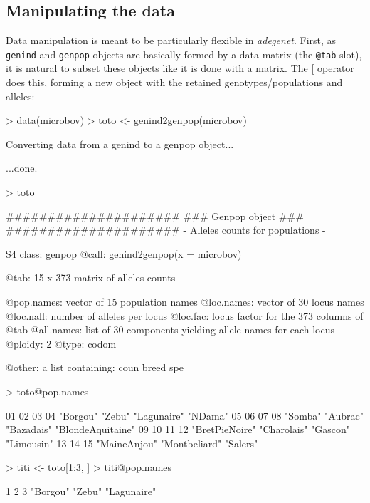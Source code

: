 \documentclass{article}
\begin{document}
\subsection{Manipulating the data}
Data manipulation is meant to be particularly flexible in \textit{adegenet}.
First, as \texttt{genind} and \texttt{genpop} objects are basically formed
by a data matrix (the \texttt{@tab} slot), it is natural to subset these objects like it is done
with a matrix.
The \texttt{$[$} operator does this, forming a new object with the retained genotypes/populations and alleles:
\begin{Schunk}
\begin{Sinput}
> data(microbov)
> toto <- genind2genpop(microbov)
\end{Sinput}
\begin{Soutput}
 Converting data from a genind to a genpop object... 

...done.
\end{Soutput}
\begin{Sinput}
> toto
\end{Sinput}
\begin{Soutput}
       #####################
       ### Genpop object ### 
       #####################
- Alleles counts for populations - 

S4 class:  genpop
@call: genind2genpop(x = microbov)

@tab:  15 x 373 matrix of alleles counts

@pop.names: vector of  15 population names
@loc.names: vector of  30 locus names
@loc.nall: number of alleles per locus
@loc.fac: locus factor for the  373 columns of @tab
@all.names: list of  30 components yielding allele names for each locus
@ploidy:  2
@type:  codom

@other: a list containing: coun  breed  spe 
\end{Soutput}
\begin{Sinput}
> toto@pop.names
\end{Sinput}
\begin{Soutput}
               01                02                03                04 
         "Borgou"            "Zebu"       "Lagunaire"           "NDama" 
               05                06                07                08 
          "Somba"          "Aubrac"        "Bazadais" "BlondeAquitaine" 
               09                10                11                12 
   "BretPieNoire"       "Charolais"          "Gascon"        "Limousin" 
               13                14                15 
     "MaineAnjou"     "Montbeliard"          "Salers" 
\end{Soutput}
\begin{Sinput}
> titi <- toto[1:3, ]
> titi@pop.names
\end{Sinput}
\begin{Soutput}
          1           2           3 
   "Borgou"      "Zebu" "Lagunaire" 
\end{Soutput}
\end{Schunk}
\end{document}
